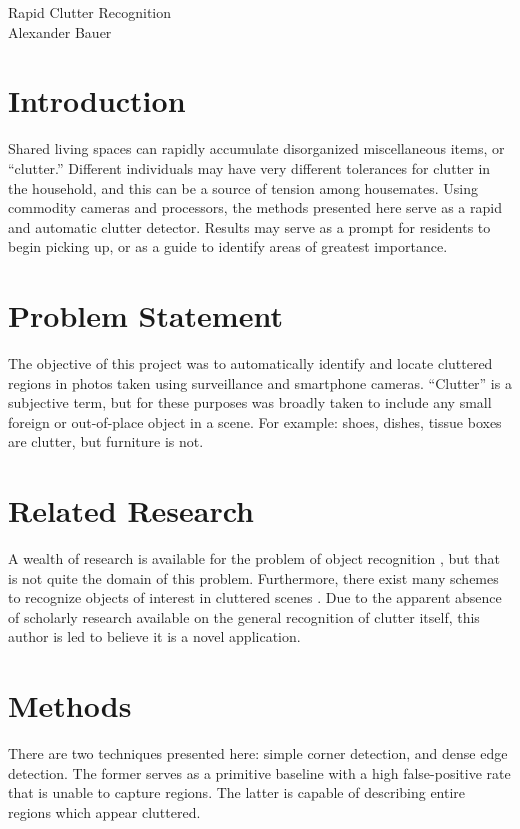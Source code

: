 \documentclass[11pt]{article}
\begin{document}
\begin{center}
    {\LARGE Rapid Clutter Recognition} \\
    {\large Alexander Bauer}
\end{center}

\section*{Introduction}

Shared living spaces can rapidly accumulate disorganized miscellaneous items, or
``clutter.'' Different individuals may have very different tolerances for
clutter in the household, and this can be a source of tension among housemates.
Using commodity cameras and processors, the methods presented here serve as a
rapid and automatic clutter detector. Results may serve as a prompt for
residents to begin picking up, or as a guide to identify areas of greatest
importance.

\section*{Problem Statement}

The objective of this project was to automatically identify and locate cluttered
regions in photos taken using surveillance and smartphone cameras.  ``Clutter''
is a subjective term, but for these purposes was broadly taken to include any
small foreign or out-of-place object in a scene. For example: shoes, dishes,
tissue boxes are clutter, but furniture is not.

\section*{Related Research}

A wealth of research is available for the problem of object
recognition \cite{Lowe99,Besl86,Torralba03,Torralba04}, but
that is not quite the domain of this problem. Furthermore, there exist many
schemes to recognize objects of interest in cluttered
scenes \cite{Mori03,Johnson99}. Due to the apparent absence of scholarly
research available on the general recognition of clutter itself, this author is
led to believe it is a novel application.

\section*{Methods}

There are two techniques presented here: simple corner detection, and dense edge
detection. The former serves as a primitive baseline with a high false-positive
rate that is unable to capture regions. The latter is capable of describing
entire regions which appear cluttered.
\end{document}
